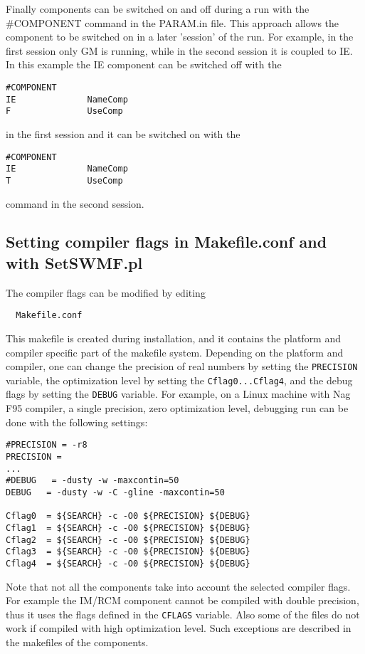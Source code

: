 Finally components can be switched on and off during a run
with the \#COMPONENT command in the PARAM.in file. 
This approach allows the component to be switched on in a later 
'session' of the run. For example, in the first session only GM 
is running, while in the second session it is coupled to IE. 
In this example the IE component can be switched off with the
\begin{verbatim}
#COMPONENT
IE              NameComp
F               UseComp
\end{verbatim}
in the first session and it can be switched on with the
\begin{verbatim}
#COMPONENT
IE              NameComp
T               UseComp
\end{verbatim}
command in the second session.



\subsection{Setting compiler flags in Makefile.conf and with SetSWMF.pl}

The compiler flags can be modified by editing
\begin{verbatim}
  Makefile.conf
\end{verbatim}
This makefile is created during installation, and it contains the
platform and compiler specific part of the makefile system.
Depending on the platform and compiler, one can change the
precision of real numbers by setting the {\tt PRECISION} variable,
the optimization level by setting the {\tt Cflag0...Cflag4},
and the debug flags by setting the {\tt DEBUG} variable.
For example, on a Linux machine with Nag F95 compiler, a single
precision, zero optimization level, debugging run can be done
with the following settings:
\begin{verbatim}
#PRECISION = -r8
PRECISION =
...
#DEBUG   = -dusty -w -maxcontin=50
DEBUG   = -dusty -w -C -gline -maxcontin=50

Cflag0  = ${SEARCH} -c -O0 ${PRECISION} ${DEBUG}
Cflag1  = ${SEARCH} -c -O0 ${PRECISION} ${DEBUG}
Cflag2  = ${SEARCH} -c -O0 ${PRECISION} ${DEBUG}
Cflag3  = ${SEARCH} -c -O0 ${PRECISION} ${DEBUG}
Cflag4  = ${SEARCH} -c -O0 ${PRECISION} ${DEBUG}
\end{verbatim}
Note that not all the components take into account the selected
compiler flags. For example the IM/RCM component cannot be 
compiled with double precision, thus it uses the flags
defined in the {\tt CFLAGS} variable. Also some of the files
do not work if compiled with high optimization level.
Such exceptions are described in the makefiles of the 
components. 


